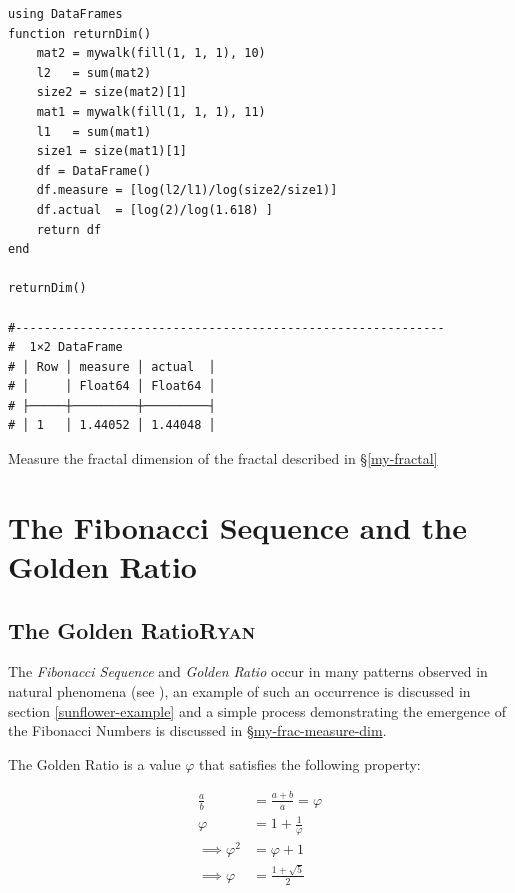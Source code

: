 \documentclass[a4paper,11pt,twoside]{article}
\begin{document}
\begin{listing}[htbp]
\begin{verbatim}
using DataFrames
function returnDim()
    mat2 = mywalk(fill(1, 1, 1), 10)
    l2   = sum(mat2)
    size2 = size(mat2)[1]
    mat1 = mywalk(fill(1, 1, 1), 11)
    l1   = sum(mat1)
    size1 = size(mat1)[1]
    df = DataFrame()
    df.measure = [log(l2/l1)/log(size2/size1)]
    df.actual  = [log(2)/log(1.618) ]
    return df
end

returnDim()

#------------------------------------------------------------
#  1×2 DataFrame
# │ Row │ measure │ actual  │
# │     │ Float64 │ Float64 │
# ├─────┼─────────┼─────────┤
# │ 1   │ 1.44052 │ 1.44048 │
\end{verbatim}
\caption{\label{my-frac-measure-dim}Measure the fractal dimension of the fractal described in \S \ref{my-fractal}}
\end{listing}

\section{The Fibonacci Sequence and the Golden Ratio}
\label{fib-golden-ratio-proof}
\subsection{The Golden Ratio\hfill{}\textsc{Ryan}}
\label{sec:org5862831}
The \emph{Fibonacci Sequence} and \emph{Golden Ratio} occur in many patterns observed
in natural phenomena (see
\cite{shellyallenFibonacciNature,benedettapalazzoNumbersNatureFibonacci2016,MinarovaNikoletta2014TFSN,NatureGoldenRatio2018,robertlambHowAreFibonacci2008,ronknottFibonacciNumbersGolden2016}),
an example of such an occurrence is discussed in section \ref{sunflower-example} and
a simple process demonstrating the emergence of the Fibonacci Numbers
is discussed in \S \hyperref[my-fractal]{my-frac-measure-dim}.

The Golden Ratio is a value \(\varphi\) that satisfies the following property:

\begin{align}
    \frac{a}{b} &=  \frac{a+  b}{a}= \varphi \nonumber \\
    \varphi &= 1+ \frac{1}{\varphi} \nonumber \\
    \implies  \varphi^2 &= \varphi +  1 \label{eq:phi-sim-to-fib-rec} \\
    \implies  \varphi &= \frac{1+ \sqrt{5} }{2} \label{eq:phi-value}
\end{align}
\end{document}
